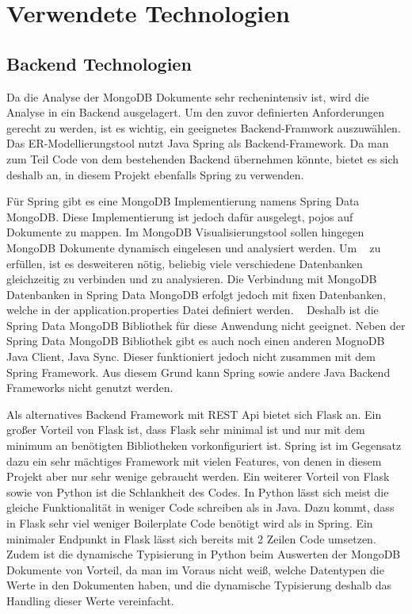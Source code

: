 \section{Verwendete Technologien}
\label{sec:verwendete_technologien}

\subsection{Backend Technologien}
\label{sec:verwendete_technologien_backend}

Da die Analyse der MongoDB Dokumente sehr rechenintensiv ist, wird die Analyse in ein Backend ausgelagert.
Um den zuvor definierten Anforderungen gerecht zu werden, ist es wichtig, ein geeignetes Backend-Framwork auszuwählen.
Das ER-Modellierungstool nutzt Java Spring als Backend-Framework.
Da man zum Teil Code von dem bestehenden Backend übernehmen könnte, bietet es sich deshalb an, in diesem Projekt ebenfalls Spring zu verwenden.

Für Spring gibt es eine MongoDB Implementierung namens Spring Data MongoDB.
Diese Implementierung ist jedoch dafür ausgelegt, \ac{pojo}s auf Dokumente zu mappen.
Im MongoDB Visualisierungstool sollen hingegen MongoDB Dokumente dynamisch eingelesen und analysiert werden.
Um ~ zu erfüllen, ist es desweiteren nötig, beliebig viele verschiedene Datenbanken gleichzeitig zu verbinden und zu analysieren.
Die Verbindung mit MongoDB Datenbanken in Spring Data MongoDB erfolgt jedoch mit fixen Datenbanken, welche in der application.properties Datei definiert werden.
~\autocite{spring:spring-data-mongodb}
Deshalb ist die Spring Data MongoDB Bibliothek für diese Anwendung nicht geeignet.
Neben der Spring Data MongoDB Bibliothek gibt es auch noch einen anderen MognoDB Java Client, Java Sync.
Dieser funktioniert jedoch nicht zusammen mit dem Spring Framework.
Aus diesem Grund kann Spring sowie andere Java Backend Frameworks nicht genutzt werden.

Als alternatives Backend Framework mit REST Api bietet sich Flask an.
Ein großer Vorteil von Flask ist, dass Flask sehr minimal ist und nur mit dem minimum an benötigten Bibliotheken vorkonfiguriert ist.
Spring ist im Gegensatz dazu ein sehr mächtiges Framework mit vielen Features, von denen in diesem Projekt aber nur sehr wenige gebraucht werden.
Ein weiterer Vorteil von Flask sowie von Python ist die Schlankheit des Codes.
In Python lässt sich meist die gleiche Funktionalität in weniger Code schreiben als in Java.
Dazu kommt, dass in Flask sehr viel weniger Boilerplate Code benötigt wird als in Spring.
Ein minimaler Endpunkt in Flask lässt sich bereits mit 2 Zeilen Code umsetzen.
Zudem ist die dynamische Typisierung in Python beim Auswerten der MongoDB Dokumente von Vorteil, da man im Voraus nicht weiß, welche Datentypen die Werte in den Dokumenten haben, und die dynamische Typisierung deshalb das Handling dieser Werte vereinfacht.
~\autocite{khoirom2020comparative}


